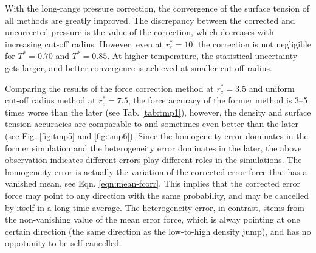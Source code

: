 \documentclass[aps,pre,preprint]{revtex4}
\begin{document}
With the long-range pressure correction, the convergence of the
surface tension of all methods are greatly improved. The discrepancy
between the corrected and uncorrected pressure is the value of the
correction, which decreases with increasing cut-off radius. However,
even at $r_c^\ast=10$, the correction is not negligible for $T^\ast =
0.70$ and $T^\ast = 0.85$. At higher temperature, the statistical
uncertainty gets larger, and better convergence is achieved at smaller
cut-off radius.

Comparing the results of the force correction method at
$r_c^\ast = 3.5$ and uniform cut-off radius method at $r_c^\ast = 7.5$, the
force accuracy of the former method is 3--5 times worse than the later
(see Tab. \ref{tab:tmp1}), however, the
density and surface tension accuracies are comparable to and
sometimes even better than the later (see Fig. \ref{fig:tmp5} and
\ref{fig:tmp6}).
Since the homogeneity error dominates in the former simulation and the
heterogeneity error dominates in the later, the above observation
indicates different errors play different roles in the simulations.
The homogeneity error is actually the variation of the corrected error
force that has a vanished mean, see Eqn. \eqref{eqn:mean-fcorr}. This
implies that the corrected error force may point to any direction with
the same probability, and may be cancelled by itself in a long time
average.  The heterogeneity error, in contrast, stems from the
non-vanishing value of the mean error force, which is alway pointing
at one certain direction (the same direction as the low-to-high
density jump), and has no oppotunity to be self-cancelled.



\end{document}

